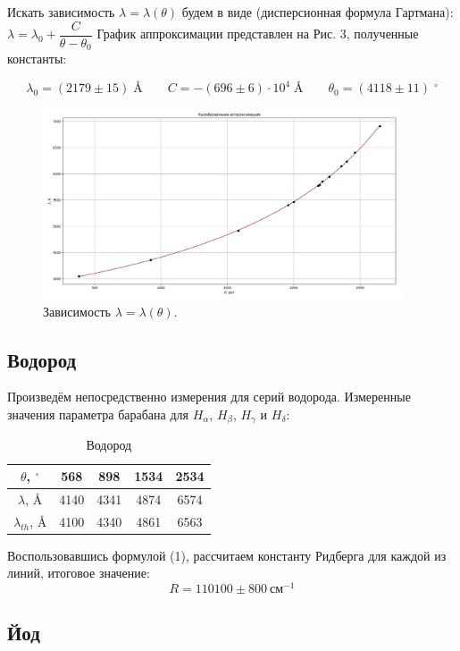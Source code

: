 \documentclass[a4paper,12pt]{article}
\theoremstyle{definition}
\begin{document}
	Искать зависимость $\lambda = \lambda(\theta)$ будем в виде (дисперсионная формула Гартмана):
	$\lambda = \lambda_0 + \dfrac{C}{\theta - \theta_0}$
	График аппроксимации представлен на Рис. 3, полученные константы:

	$$\lambda_0 = (2179 \pm 15)\; \text{\AA} \qquad C = -(696 \pm 6) \cdot 10^4\; \text{\AA} \qquad \theta_0 = (4118 \pm 11)\; ^\circ$$
	
	\newpage

	\begin{figure}
	\includegraphics[width = 0.95\textwidth]{3.jpg}
	\centering
	\caption{Зависимость $\lambda = \lambda(\theta)$.}
	\end{figure}

	\subsection*{Водород}

	Произведём непосредственно измерения для серий водорода. Измеренные значения параметра барабана для $H_\alpha$, $H_\beta$, $H_\gamma$ и $H_\delta$:
	\begin{table}[h]
		\centering
		\caption{Водород}
		\begin{tabular}{|c|c|c|c|c|} \hline
			$\theta$, $^\circ$ & 568  &  898 & 1534 & 2534 \\ \hline
			$\lambda$, \AA	   & 4140 & 4341 & 4874 & 6574 \\ \hline
			$\lambda_{th}$, \AA& 4100 & 4340 & 4861 & 6563\\ \hline
		\end{tabular}
	\end{table}

	Воспользовавшись формулой (1), рассчитаем константу Ридберга для каждой из линий, итоговое значение:
	$$R = 110100 \pm 800~\text{см}^{-1}$$

	\subsection*{Йод}
\end{document}
